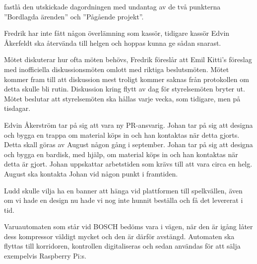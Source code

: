 \documentclass{protokoll}
\begin{document}
\newpage  


\begin{beslut}
     \att fastlå den utskickade dagordningen med undantag av de två punkterna ''Bordlagda ärenden'' och ''Pågående projekt''.
\end{beslut}

Fredrik har inte fått någon överlämning som kassör, tidigare kassör Edvin Åkerfeldt ska återvända till helgen och hoppas kunna ge sådan snarast. 

Mötet diskuterar hur ofta möten behövs, Fredrik föreslår att Emil Kitti's föreslag med inofficiella diskussionsmöten omlott med riktiga beslutsmöten. Mötet kommer fram till att diskussion mest troligt kommer saknas från protokollen om detta skulle bli rutin. 
Diskussion kring flytt av dag för styrelsemöten bryter ut. 
Mötet beslutar att styrelsemöten ska hållas varje vecka, som tidigare, men på tisdagar. 

Edvin Åkerström tar på sig att vara ny PR-ansvarig.
Johan tar på sig att designa och bygga en trappa om material köps in och han kontaktas när detta gjorts. Detta skall göras av August någon gång i september.
Johan tar på sig att designa och bygga en bardisk, med hjälp, om material köps in och han kontaktas när detta är gjort. Johan uppskattar arbetstiden som krävs till att vara circa en helg. August ska kontakta Johan vid någon punkt i framtiden.

Ludd skulle vilja ha en banner att hänga vid plattformen till spelkvällen, även om vi hade en design nu hade vi nog inte hunnit beställa och få det levererat i tid.

Varuautomaten som står vid BOSCH bedöms vara i vägen, när den är igång låter dess kompressor väldigt mycket och den är därför avstängd. Automaten ska flyttas till korridoren, kontrollen digitaliseras och sedan användas för att sälja exempelvis Raspberry Pi:s.
\end{document}
